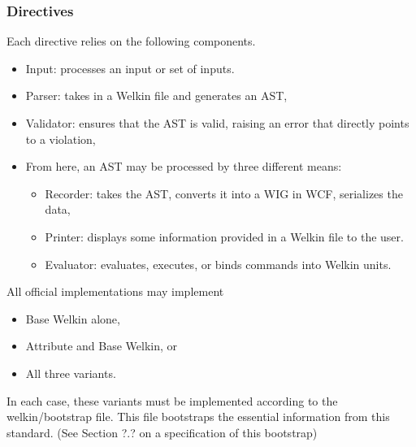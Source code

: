 \subsubsection*{Directives}
Each directive relies on the following components.
\begin{itemize}
  \item Input: processes an input or set of inputs.
  \item Parser: takes in a Welkin file and generates an AST,
  \item Validator: ensures that the AST is valid, raising an error that directly points to a violation,
  \item From here, an AST may be processed by three different means:
		\begin{itemize}
		  \item Recorder: takes the AST, converts it into a WIG in WCF, serializes the data,
		  \item Printer: displays some information provided in a Welkin file to the user.
		  \item Evaluator: evaluates, executes, or binds commands into Welkin units.
		\end{itemize}
\end{itemize}

All official implementations may implement
\begin{itemize}
\item Base Welkin alone,
\item Attribute and Base Welkin, or
\item All three variants.
\end{itemize}

In each case, these variants must be implemented according to the welkin/bootstrap file. This file bootstraps the essential information from this standard. (See Section ?.? on a specification of this bootstrap)


